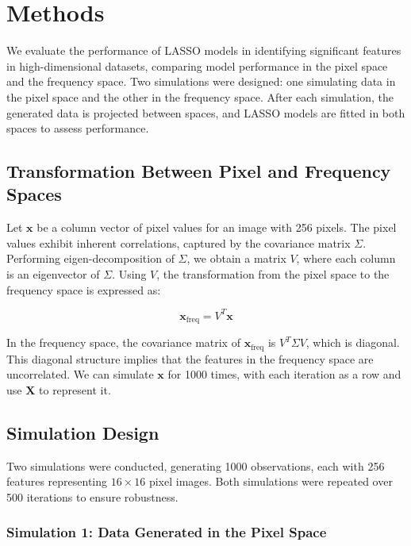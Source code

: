\documentclass[12pt]{article}
\begin{document}
\section*{Methods}

We evaluate the performance of LASSO models in identifying significant features in high-dimensional datasets, comparing model performance in the pixel space and the frequency space. Two simulations were designed: one simulating data in the pixel space and the other in the frequency space. After each simulation, the generated data is projected between spaces, and LASSO models are fitted in both spaces to assess performance.

\subsection*{Transformation Between Pixel and Frequency Spaces}

Let \( \mathbf{x} \) be a column vector of pixel values for an image with 256 pixels. The pixel values exhibit inherent correlations, captured by the covariance matrix \( \Sigma \). Performing eigen-decomposition of \( \Sigma \), we obtain a matrix \( V \), where each column is an eigenvector of \( \Sigma \). Using \( V \), the transformation from the pixel space to the frequency space is expressed as:

\[
\mathbf{x}_{\text{freq}} = V^T \mathbf{x}
\]

In the frequency space, the covariance matrix of \( \mathbf{x}_{\text{freq}} \) is \( V^T \Sigma V \), which is diagonal. This diagonal structure implies that the features in the frequency space are uncorrelated. We can simulate \( \mathbf{x} \) for 1000 times, with each iteration as a row and use \( \mathbf{X} \) to represent it.

\subsection*{Simulation Design}

Two simulations were conducted, generating 1000 observations, each with 256 features representing \( 16 \times 16 \) pixel images. Both simulations were repeated over 500 iterations to ensure robustness.

\subsubsection*{Simulation 1: Data Generated in the Pixel Space}
\end{document}
